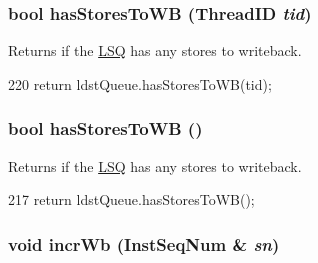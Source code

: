 \hypertarget{classDefaultIEW_a7e6f40e5ef3dbfe9d3d8da2dbeaf2b91}{
\subsubsection[{hasStoresToWB}]{\setlength{\rightskip}{0pt plus 5cm}bool hasStoresToWB ({\bf ThreadID} {\em tid})}}
\label{classDefaultIEW_a7e6f40e5ef3dbfe9d3d8da2dbeaf2b91}
Returns if the \hyperlink{classLSQ}{LSQ} has any stores to writeback. 


\begin{DoxyCode}
220 { return ldstQueue.hasStoresToWB(tid); }
\end{DoxyCode}
\hypertarget{classDefaultIEW_ad2e4b46255cfb53e85522adeed4e2089}{
\subsubsection[{hasStoresToWB}]{\setlength{\rightskip}{0pt plus 5cm}bool hasStoresToWB ()}}
\label{classDefaultIEW_ad2e4b46255cfb53e85522adeed4e2089}
Returns if the \hyperlink{classLSQ}{LSQ} has any stores to writeback. 


\begin{DoxyCode}
217 { return ldstQueue.hasStoresToWB(); }
\end{DoxyCode}
\hypertarget{classDefaultIEW_a203d5348c070560c49290bcaf1c4496a}{
\subsubsection[{incrWb}]{\setlength{\rightskip}{0pt plus 5cm}void incrWb ({\bf InstSeqNum} \& {\em sn})}}
\label{classDefaultIEW_a203d5348c070560c49290bcaf1c4496a}



